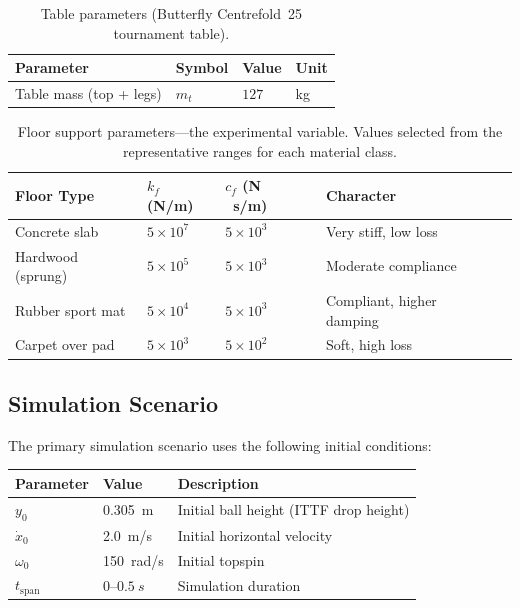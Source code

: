 \documentclass[11pt,a4paper]{article}
\begin{document}
\begin{table}[ht]
\centering
\caption{Table parameters (Butterfly Centrefold~25 tournament table).}
\label{tab:table}
\begin{tabular}{@{}llll@{}}
  \toprule
  Parameter & Symbol & Value & Unit \\
  \midrule
  Table mass (top + legs) & $m_t$ & $127$ & \si{kg} \\
  \bottomrule
\end{tabular}
\end{table}

\begin{table}[ht]
\centering
\caption{Floor support parameters---the experimental variable. Values
selected from the representative ranges for each material class.}
\label{tab:floor}
\begin{tabular}{@{}lllll@{}}
  \toprule
  Floor Type & $k_f$ (\si{N/m}) & $c_f$ (\si{N\,s/m}) & Character \\
  \midrule
  Concrete slab     & $5 \times 10^7$ & $5 \times 10^3$ & Very stiff, low loss \\
  Hardwood (sprung) & $5 \times 10^5$ & $5 \times 10^3$ & Moderate compliance \\
  Rubber sport mat  & $5 \times 10^4$ & $5 \times 10^3$ & Compliant, higher damping \\
  Carpet over pad   & $5 \times 10^3$ & $5 \times 10^2$ & Soft, high loss \\
  \bottomrule
\end{tabular}
\end{table}

\subsection{Simulation Scenario}

The primary simulation scenario uses the following initial conditions:

\begin{center}
\begin{tabular}{@{}lll@{}}
  \toprule
  Parameter & Value & Description \\
  \midrule
  $y_0$ & \SI{0.305}{m} & Initial ball height (ITTF drop height) \\
  $\dot{x}_0$ & \SI{2.0}{m/s} & Initial horizontal velocity \\
  $\omega_0$ & \SI{150}{rad/s} & Initial topspin \\
  $t_{\text{span}}$ & $0$--$\SI{0.5}{s}$ & Simulation duration \\
  \bottomrule
\end{tabular}
\end{center}
\end{document}
